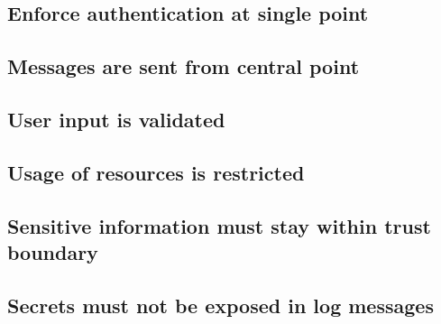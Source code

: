 \subsection{Enforce authentication at single point}

\subsection{Messages are sent from central point}

\subsection{User input is validated}

\subsection{Usage of resources is restricted}

\subsection{Sensitive information must stay within trust boundary}

\subsection{Secrets must not be exposed in log messages}

